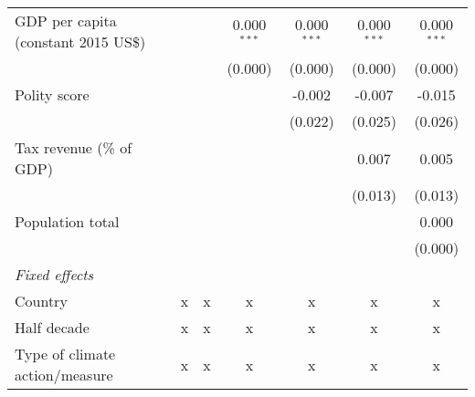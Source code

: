 \begin{tabular}{lcccccc}
   GDP per capita (constant 2015 US\$)                                                             &             &               & 0.000$^{***}$  & 0.000$^{***}$  & 0.000$^{***}$  & 0.000$^{***}$\\   
                                                                                                   &             &               & (0.000)        & (0.000)        & (0.000)        & (0.000)\\   
   Polity score                                                                                    &             &               &                & -0.002         & -0.007         & -0.015\\   
                                                                                                   &             &               &                & (0.022)        & (0.025)        & (0.026)\\   
   Tax revenue (\% of GDP)                                                                         &             &               &                &                & 0.007          & 0.005\\   
                                                                                                   &             &               &                &                & (0.013)        & (0.013)\\   
   Population total                                                                                &             &               &                &                &                & 0.000\\   
                                                                                                   &             &               &                &                &                & (0.000)\\   
   \emph{Fixed effects}\\
   Country                                                                                         & x           & x             & x              & x              & x              & x\\  
   Half decade                                                                                     & x           & x             & x              & x              & x              & x\\  
   Type of climate action/measure                                                                  & x           & x             & x              & x              & x              & x\\  

\end{tabular}
